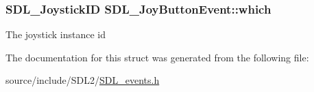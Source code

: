 \subsubsection[{which}]{\setlength{\rightskip}{0pt plus 5cm}S\+D\+L\+\_\+\+Joystick\+I\+D S\+D\+L\+\_\+\+Joy\+Button\+Event\+::which}\label{struct_s_d_l___joy_button_event_a1679049adad7242b28420948fdc79044}
The joystick instance id 

The documentation for this struct was generated from the following file\+:\begin{DoxyCompactItemize}
\item 
source/include/\+S\+D\+L2/\hyperlink{_s_d_l__events_8h}{S\+D\+L\+\_\+events.\+h}\end{DoxyCompactItemize}
